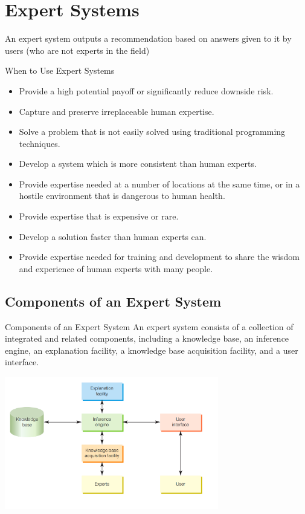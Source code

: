 \documentclass[\main/notes.tex]{subfiles}
\begin{document}
		\section{Expert Systems}
			An expert system outputs a recommendation based on answers given to it by users (who are not experts in the field)
			\begin{sidenote}{When to Use Expert Systems}
				\begin{itemize}
					\item Provide a high potential payoff or significantly reduce downside risk.
					\item Capture and preserve irreplaceable human expertise.
					\item Solve a problem that is not easily solved using traditional programming techniques.
					\item Develop a system which is more consistent than human experts.
					\item Provide expertise needed at a number of locations at the same time, or in a hostile environment that is dangerous to human health.
					\item Provide expertise that is expensive or rare.
					\item Develop a solution faster than human experts can.
					\item Provide expertise needed for training and development to share the wisdom and experience of human experts with many people.
				\end{itemize}
			\end{sidenote}
			\subsection{Components of an Expert System}
				\begin{sidenote}{Components of an Expert System}
					An expert system consists of a collection of integrated and related components, including a knowledge base, an inference engine, an explanation facility, a knowledge base acquisition facility, and a user interface.
					\begin{center}
						\includegraphics[width=0.7\textwidth]{chapter09/expert_systems.png}
					\end{center}
				\end{sidenote}
\end{document}
